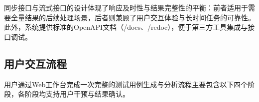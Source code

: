 同步接口与流式接口的设计体现了响应及时性与结果完整性的平衡：前者适用于需要全量结果的后续处理场景，后者则兼顾了用户交互体验与长时间任务的可靠性。此外，系统提供标准的OpenAPI文档（/docs、/redoc），便于第三方工具集成与接口调试。

\subsection{用户交互流程}
\label{sec:user-interaction}

用户通过Web工作台完成一次完整的测试用例生成与分析流程主要包含以下四个阶段，各阶段均支持用户干预与结果确认。


